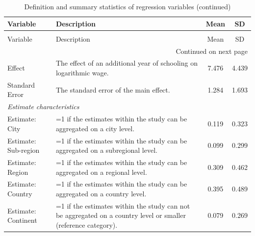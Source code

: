 \begin{singlespace}
  \begin{scriptsize}
  \begin{longtable}{
  @{\hskip\tabcolsep\extracolsep\fill}
  l
  p{0.55\hsize}
  cc
  @{}
  } %
  \caption{Definition and summary statistics of regression variables}  \label{tab:var}\\
  \toprule
    \multicolumn{1}{l}{Variable} &   \multicolumn{1}{l}{Description} &         \multicolumn{1}{c}{Mean} &           \multicolumn{1}{c}{SD} \\
  \midrule
  \endfirsthead
  \caption[]{Definition and summary statistics of regression variables (continued)}\\
  \toprule
    \multicolumn{1}{l}{Variable} &   \multicolumn{1}{l}{Description} &         \multicolumn{1}{c}{Mean} &           \multicolumn{1}{c}{SD} \\
  \midrule
  \endhead
  \bottomrule
  \multicolumn{4}{r}{{\scriptsize Continued on next page}} \\
  \endfoot
  \endlastfoot
  Effect & The effect of an additional year of schooling on logarithmic wage. & 7.476 & 4.439 \\
  Standard Error & The standard error of the main effect. & 1.284 & 1.693 \\
  \midrule
  
  \multicolumn{4}{l}{\emph{Estimate characteristics}}\\
  Estimate: City & =1 if the estimates within the study can be aggregated on a city level. & 0.119 & 0.323 \\
  Estimate: Sub-region & =1 if the estimates within the study can be aggregated on a subregional level. & 0.099 & 0.299 \\
  Estimate: Region & =1 if the estimates within the study can be aggregated on a regional level. & 0.309 & 0.462 \\
  Estimate: Country & =1 if the estimates within the study can be aggregated on a country level. & 0.395 & 0.489 \\
  Estimate: Continent & =1 if the estimates within the study can not be aggregated on a country level or smaller (reference category). & 0.079 & 0.269 \\
  \midrule
  

\end{longtable}
\end{scriptsize}
\end{singlespace}
